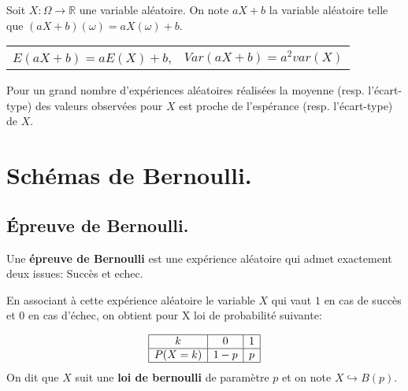 \documentclass[a4paper,11pt]{article}
\theoremstyle{break}
\renewcommand\arraystretch{1.3}
\renewcommand\arraystretch{1.8}
\begin{document}
     \begin{theorem}
    Soit $X:\Omega \to \mathbb{R}$ une variable aléatoire. On note $aX+b$ la variable aléatoire
     telle que $(aX+b)(\omega)=aX(\omega)+b$.
     
      \begin{centering}
      \begin{tabular}{c c}
   $E(aX+b)=aE(X)+b$,& $Var(aX+b)=a^2 var(X)$ 
   \end{tabular}

   \end{centering}
     
   \end{theorem}
   
      \begin{theorem}
    
    Pour un grand nombre d'expériences aléatoires réalisées la moyenne (resp. l'écart-type)
    des valeurs observées pour $X$ est proche de l'espérance (resp. l'écart-type) de $X$.
    
   \end{theorem}
   
   \newpage
 
   
    \section{Schémas de Bernoulli.}
  \subsection{\'Epreuve de Bernoulli.}

  \begin{definition}
    Une \textbf{épreuve de Bernoulli} est une expérience aléatoire qui admet exactement deux issues:
    Succès et echec.
    
    En associant à cette expérience aléatoire le variable $X$ qui vaut $1$ en cas de succès et 
    $0$ en cas d'échec, on obtient pour X loi de probabilité suivante:
     
     \renewcommand{\arraystretch}{1.5}
 $$
\begin{array}{|c|c|c|}

\hline
    k&0&1\\
    \hline
    P(X=k)&1-p&p\\
    \hline
    \end{array} 
$$   
     On dit que $X$ suit une \textbf{loi de bernoulli} de paramètre $p$ et on note $X \hookrightarrow B(p)$.
  \end{definition}
\end{document}
